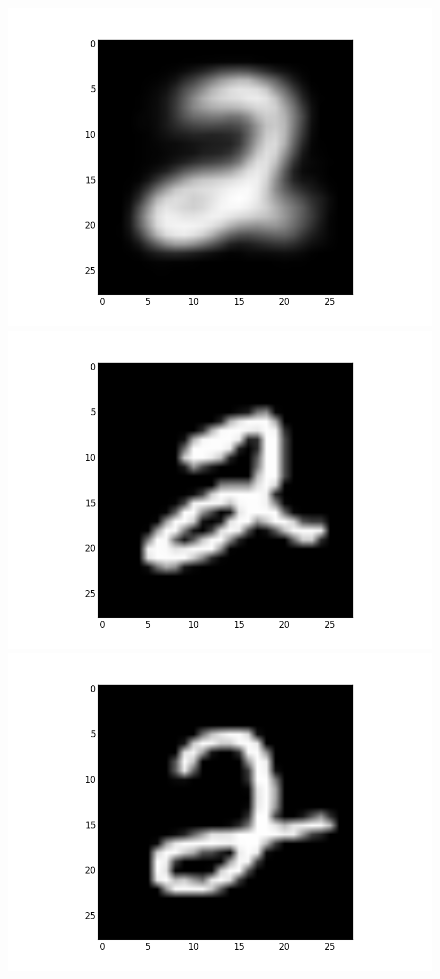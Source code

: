 \documentclass[submit]{harvardml}
\begin{document}
\begin{figure}[ht]
    \centering
    \includegraphics[scale=0.20]{K10-mean-9}
    \includegraphics[scale=0.20]{K10-representative-9-0}
    \includegraphics[scale=0.20]{K10-representative-9-1}

\end{figure}
\end{document}
